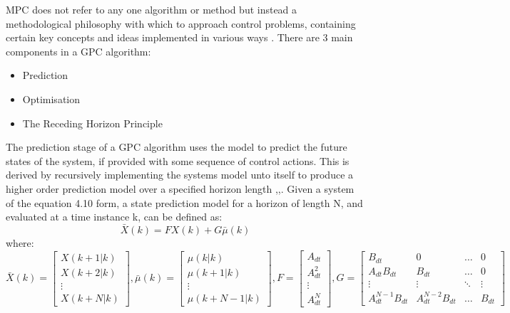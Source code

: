 \documentclass[12pt,a4paper,twoside]{report}
\begin{document}
				MPC does not refer to any one algorithm or method but instead a methodological philosophy with which to approach control problems, containing certain key concepts and ideas implemented in various ways \cite{26}. There are 3 main components in a GPC algorithm:
				\begin{itemize}
					\item 
						Prediction
					\item
						Optimisation
					\item
						The Receding Horizon Principle
				\end{itemize}
				\space
				The prediction stage of a GPC algorithm uses the model to predict the future states of the system, if provided with some sequence of control actions. This is derived by recursively implementing the systems model unto itself to produce a higher order prediction model over a specified horizon length \cite{25},\cite{26},\cite{27}. Given a system of the equation 4.10 form, a state prediction model for a horizon of length N, and evaluated at a time instance k, can be defined as:
				\begin{equation}
					\bar{X}(k) = F X(k) + G \bar{\mu}(k)
				\end{equation}
				where:
				\begin{equation}
					\bar{X}(k) = 
					\begin{bmatrix}
						X(k+1|k)\\
						X(k+2|k)\\
						\vdots\\
						X(k+N|k)
					\end{bmatrix}
					,
					\bar{\mu}(k) = 
					\begin{bmatrix}
						\mu(k|k)\\
						\mu(k+1|k)\\
						\vdots\\
						\mu(k+N-1|k)
					\end{bmatrix}
					,
					F =
					\begin{bmatrix}
						A_{dt}\\
						A_{dt}^{2}\\
						\vdots\\
						A_{dt}^{N}
					\end{bmatrix}
					,
					G =
					\begin{bmatrix}
						B_{dt} & 0 & \dots & 0\\
						A_{dt}B_{dt}& B_{dt}& \dots & 0\\
						\vdots& \vdots & \ddots & \vdots\\ 
						A_{dt}^{N-1}B_{dt}& A_{dt}^{N-2}B_{dt} & \dots & B_{dt}
					\end{bmatrix}
				\end{equation}
\end{document}
